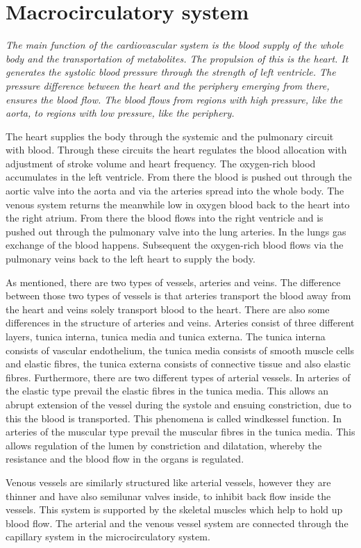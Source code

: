 

\section{Macrocirculatory system}
\textit{The main function of the cardiovascular system is the blood supply of the whole body and the transportation of metabolites. The propulsion of this is the heart. It generates the systolic blood pressure through the strength of left ventricle. The pressure difference between the heart and the periphery emerging from there, ensures the blood flow. The blood flows from regions with high pressure, like the aorta, to regions with low pressure, like the periphery.\cite{martini2012}}

The heart supplies the body through the systemic and the pulmonary circuit with blood. Through these circuits the heart regulates the blood allocation with adjustment of stroke volume and heart frequency. The oxygen-rich blood accumulates in the left ventricle. From there the blood is pushed out through the aortic valve into the aorta and via the arteries spread into the whole body. The venous system returns the meanwhile low in oxygen blood back to the heart into the right atrium. From there the blood flows into the right ventricle and is pushed out through the pulmonary valve into the lung arteries. In the lungs gas exchange of the blood happens. Subsequent the oxygen-rich blood flows via the pulmonary veins back to the left heart to supply the body.\cite{martini2012}

As mentioned, there are two types of vessels, arteries and veins. The difference between those two types of vessels is that arteries transport the blood away from the heart and veins solely transport blood to the heart. There are also some differences in the structure of arteries and veins.
Arteries consist of three different layers, tunica interna, tunica media and tunica externa. The tunica interna consists of vascular endothelium, the tunica media consists of smooth muscle cells and elastic fibres, the tunica externa consists of connective tissue and also elastic fibres. Furthermore, there are two different types of arterial vessels. In arteries of the elastic type prevail the elastic fibres in the tunica media. This allows an abrupt extension of the vessel during the systole and ensuing constriction, due to this the blood is transported. This phenomena is called windkessel function. In arteries of the muscular type prevail the muscular fibres in the tunica media. This allows regulation of the lumen by constriction and dilatation, whereby the resistance and the blood flow in the organs is regulated.\cite{martini2012}

Venous vessels are similarly structured like arterial vessels, however they are thinner and have also semilunar valves inside, to inhibit back flow inside the vessels. This system is supported by the skeletal muscles which help to hold up blood flow. The arterial and the venous vessel system are connected through the capillary system in the microcirculatory system.\cite{martini2012}
